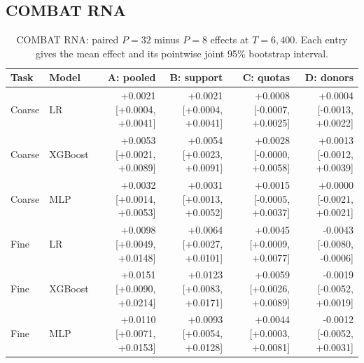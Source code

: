 \subsection{COMBAT RNA}
\begin{table}[htbp]\centering\small
\setlength{\tabcolsep}{3pt}\renewcommand{\arraystretch}{1.2}
\caption{COMBAT RNA: paired $P=32$ minus $P=8$ effects at $T=6{,}400$. Each entry gives the mean effect and its pointwise joint 95\% bootstrap interval.}
\begin{tabular}{llrrrr}\toprule
Task & Model & A: pooled & B: support & C: quotas & D: donors \\\midrule
Coarse & LR & \makecell{+0.0021\\{[+0.0004, +0.0041]}} & \makecell{+0.0021\\{[+0.0004, +0.0041]}} & \makecell{+0.0008\\{[-0.0007, +0.0025]}} & \makecell{+0.0004\\{[-0.0013, +0.0022]}} \\
Coarse & XGBoost & \makecell{+0.0053\\{[+0.0021, +0.0089]}} & \makecell{+0.0054\\{[+0.0023, +0.0091]}} & \makecell{+0.0028\\{[-0.0000, +0.0058]}} & \makecell{+0.0013\\{[-0.0012, +0.0039]}} \\
Coarse & MLP & \makecell{+0.0032\\{[+0.0014, +0.0053]}} & \makecell{+0.0031\\{[+0.0013, +0.0052]}} & \makecell{+0.0015\\{[-0.0005, +0.0037]}} & \makecell{+0.0000\\{[-0.0021, +0.0021]}} \\
Fine & LR & \makecell{+0.0098\\{[+0.0049, +0.0148]}} & \makecell{+0.0064\\{[+0.0027, +0.0101]}} & \makecell{+0.0045\\{[+0.0009, +0.0077]}} & \makecell{-0.0043\\{[-0.0080, -0.0006]}} \\
Fine & XGBoost & \makecell{+0.0151\\{[+0.0090, +0.0214]}} & \makecell{+0.0123\\{[+0.0083, +0.0171]}} & \makecell{+0.0059\\{[+0.0026, +0.0089]}} & \makecell{-0.0019\\{[-0.0052, +0.0019]}} \\
Fine & MLP & \makecell{+0.0110\\{[+0.0071, +0.0153]}} & \makecell{+0.0093\\{[+0.0054, +0.0128]}} & \makecell{+0.0044\\{[+0.0003, +0.0081]}} & \makecell{-0.0012\\{[-0.0052, +0.0031]}} \\
\bottomrule\end{tabular}\end{table}
